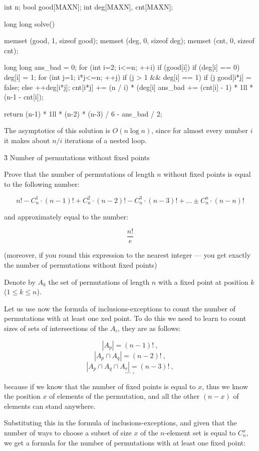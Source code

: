 \code
int n;
bool good[MAXN];
int deg[MAXN], cnt[MAXN];

long long solve() {
memset (good, 1, sizeof good);
memset (deg, 0, sizeof deg);
memset (cnt, 0, sizeof cnt);

long long ans_bad = 0;
for (int i=2; i<=n; ++i) {
if (good[i]) {
if (deg[i] == 0) deg[i] = 1;
for (int j=1; i*j<=n; ++j) {
if (j > 1 && deg[i] == 1)
if (j %
good[i*j] = false;
else
++deg[i*j];
cnt[i*j] += (n / i) * (deg[i]%
}
}
ans_bad += (cnt[i] - 1) * 1ll * (n-1 - cnt[i]);
}

return (n-1) * 1ll * (n-2) * (n-3) / 6 - ans_bad / 2;
}
\endcode

The asymptotics of this solution is $O (n \log n)$, since for almost every number $i$ it makes about $n/i$ iterations of a nested loop.


\h3{ Number of permutations without fixed points }

Prove that the number of permutations of length $n$ without fixed points is equal to the following number:

$$ n! - C_n^1 \cdot (n-1)! + C_n^2 \cdot (n-2)! - C_n^3 \cdot (n-3)! + \ldots \pm C_n^n \cdot (n-n)! $$

and approximately equal to the number:

$$ \frac{ n! }{ e } $$

(moreover, if you round this expression to the nearest integer --- you get exactly the number of permutations without fixed points)

Denote by $A_k$ the set of permutations of length $n$ with a fixed point at position $k$ ($1 \le k \le n$).

Let us use now the formula of inclusions-exceptions to count the number of permutations with at least one xed point. To do this we need to learn to count sizes of sets of intersections of the $A_i$, they are as follows:

$$ \left| A_p \right| = (n-1)! ~, $$
$$ \left| A_p \cap A_q \right| = (n-2)! ~, $$
$$ \left| A_p \cap A_q \cap A_r \right| = (n-3)! ~, $$
$$ \ldots ~, $$

because if we know that the number of fixed points is equal to $x$, thus we know the position $x$ of elements of the permutation, and all the other $(n-x)$ of elements can stand anywhere.

Substituting this in the formula of inclusions-exceptions, and given that the number of ways to choose a subset of size $x$ of the $n$-element set is equal to $C_n^x$, we get a formula for the number of permutations with at least one fixed point:

